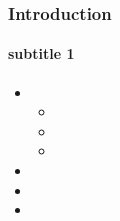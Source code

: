 \begin{frame}
    \frametitle{Introduction}
    \framesubtitle{subtitle 1}
    \begin{itemize}
        \item 
        \begin{itemize}
        \item 
        \item 
        \item 
    \end{itemize}
        \item 
        \item 
        \item 

    \end{itemize}
\end{frame}
